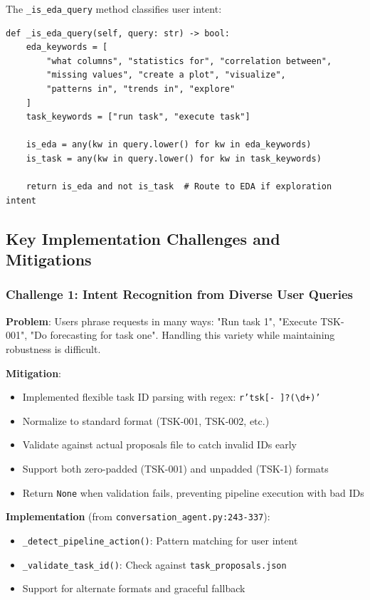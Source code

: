 \documentclass[11pt,a4paper]{article}
\begin{document}
The \texttt{\_is\_eda\_query} method classifies user intent:

\begin{verbatim}
def _is_eda_query(self, query: str) -> bool:
    eda_keywords = [
        "what columns", "statistics for", "correlation between",
        "missing values", "create a plot", "visualize",
        "patterns in", "trends in", "explore"
    ]
    task_keywords = ["run task", "execute task"]

    is_eda = any(kw in query.lower() for kw in eda_keywords)
    is_task = any(kw in query.lower() for kw in task_keywords)

    return is_eda and not is_task  # Route to EDA if exploration intent
\end{verbatim}

\subsection{Key Implementation Challenges and Mitigations}

\subsubsection{Challenge 1: Intent Recognition from Diverse User Queries}

\textbf{Problem}: Users phrase requests in many ways: "Run task 1", "Execute TSK-001", "Do forecasting for task one". Handling this variety while maintaining robustness is difficult.

\textbf{Mitigation}:
\begin{itemize}
    \item Implemented flexible task ID parsing with regex: \texttt{r'tsk[- ]?(\textbackslash d+)'}
    \item Normalize to standard format (TSK-001, TSK-002, etc.)
    \item Validate against actual proposals file to catch invalid IDs early
    \item Support both zero-padded (TSK-001) and unpadded (TSK-1) formats
    \item Return \texttt{None} when validation fails, preventing pipeline execution with bad IDs
\end{itemize}

\textbf{Implementation} (from \texttt{conversation\_agent.py:243-337}):
\begin{itemize}
    \item \texttt{\_detect\_pipeline\_action()}: Pattern matching for user intent
    \item \texttt{\_validate\_task\_id()}: Check against \texttt{task\_proposals.json}
    \item Support for alternate formats and graceful fallback
\end{itemize}
\end{document}
